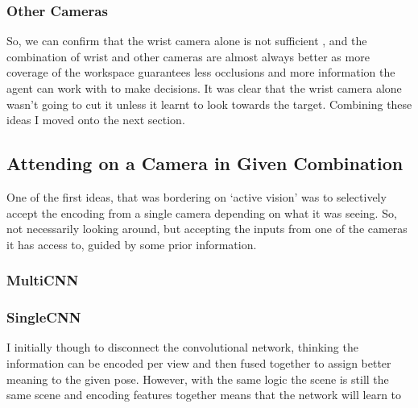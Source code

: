 \subsubsection{Other Cameras}
So, we can confirm that the wrist camera alone is not sufficient , and the combination of wrist and other cameras are almost always better as more coverage of the workspace guarantees less occlusions and more information the agent can work with to make decisions. It was clear that the wrist camera alone wasn't going to cut it unless it learnt to look towards the target. Combining these ideas I moved onto the next section.

\subsection{Attending on a Camera in Given Combination}
One of the first ideas, that was bordering on `active vision' was to selectively accept the encoding from a single camera depending on what it was seeing. So, not necessarily looking around, but accepting the inputs from one of the cameras it has access to, guided by some prior information.


\subsubsection{MultiCNN}
\subsubsection{SingleCNN}
I initially though to disconnect the convolutional network, thinking the information can be encoded per view and then fused together to assign better meaning to the given pose. However, with the same logic the scene is still the same scene and encoding features together means that the network will learn to 